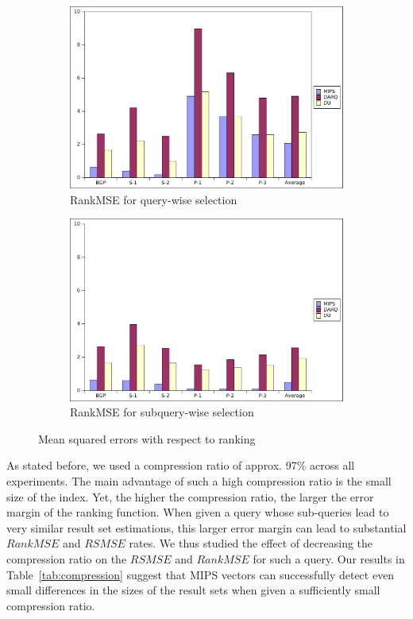 \documentclass{sig-alternate}  %
\begin{document}
\begin{figure}
\centering				
\begin{subfigure}[b]{0.45\textwidth}
                \centering
\includegraphics[width=\textwidth]{img/querywise_ranking}
                \caption{RankMSE for query-wise selection}
                \label{fig:rankQuery}
        \end{subfigure}				
				\begin{subfigure}[b]{0.45\textwidth}
                \centering
\includegraphics[width=\textwidth]{img/subquerywise_ranking}
                \caption{RankMSE for subquery-wise selection}
                \label{fig:rankSubquery}
        \end{subfigure}
\caption{Mean squared errors with respect to ranking}
\label{fig:rank}
\end{figure}

As stated before, we used a compression ratio of approx. 97\% across all experiments. 
The main advantage of such a high compression ratio is the small size of the index. 
Yet, the higher the compression ratio, the larger the error margin of the ranking function.
When given a query whose sub-queries lead to very similar result set estimations,  this larger error margin can lead to substantial $RankMSE$ and $RSMSE$ rates.
We thus studied the effect of decreasing the compression ratio on the $RSMSE$ and $RankMSE$ for such a query.
Our results in Table~\ref{tab:compression} suggest that MIPS vectors can successfully detect even small differences in the sizes of the result sets when given a sufficiently small compression ratio.
\end{document}
